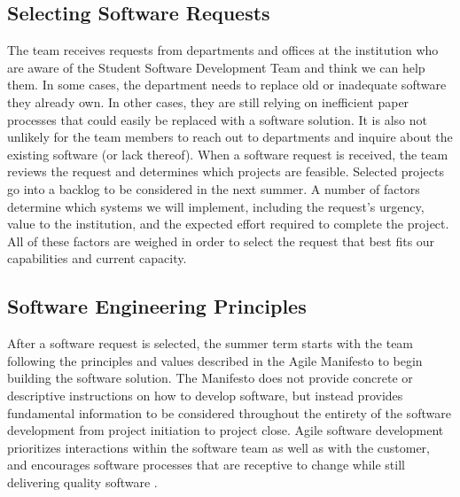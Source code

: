 \subsection{Selecting Software Requests}
The team receives requests from departments and offices at the institution who are aware of the Student Software Development Team and think we can help them. In some cases, the department needs to replace old or inadequate software they already own. In other cases, they are still relying on inefficient paper processes that could easily be replaced with a software solution. It is also not unlikely for the team members to reach out to departments and inquire about the existing software (or lack thereof). When a software request is received, the team reviews the request and determines which projects are feasible. Selected projects go into a backlog to be considered in the next summer. A number of factors determine which systems we will implement, including the request's urgency, value to the institution, and the expected effort required to complete the project. All of these factors are weighed in order to select the request that best fits our capabilities and current capacity.

\subsection{Software Engineering Principles}
After a software request is selected, the summer term starts with the team following the principles and values described in the Agile Manifesto to begin building the software solution. The Manifesto does not provide concrete or descriptive instructions on how to develop software, but instead provides fundamental information to be considered throughout the entirety of the software development from project initiation to project close. Agile software development prioritizes interactions within the software team as well as with the customer, and encourages software processes that are receptive to change while still delivering quality software \cite{agilemanifesto}. %

